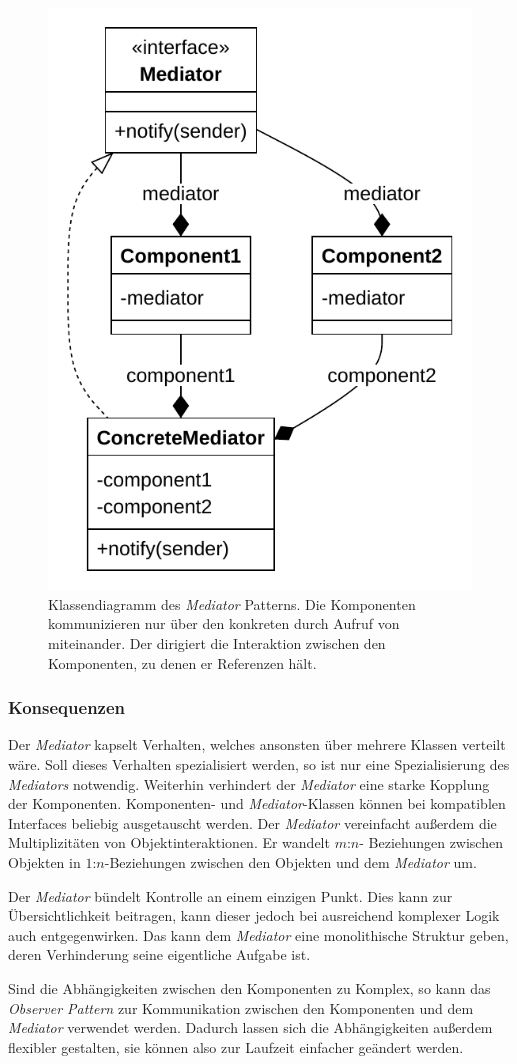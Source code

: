 \begin{figure}[!ht]
	\centering
	\includegraphics[width=0.75\linewidth]{images/patterns/mediator-class.pdf}
	\caption{Klassendiagramm des \emph{Mediator} Patterns. Die Komponenten kommunizieren nur über den konkreten  durch Aufruf von  miteinander. Der  dirigiert die Interaktion zwischen den Komponenten, zu denen er Referenzen hält. \cite{skobeleva_mediator_2023}}
	\label{fig:mediator-class}
\end{figure}

\subsubsection*{Konsequenzen}

Der \emph{Mediator} kapselt Verhalten, welches ansonsten über mehrere Klassen verteilt wäre. Soll dieses Verhalten spezialisiert werden, so ist nur eine Spezialisierung des \emph{Mediators} notwendig. Weiterhin verhindert der \emph{Mediator} eine starke Kopplung der Komponenten. Komponenten- und \emph{Mediator}-Klassen können bei kompatiblen Interfaces beliebig ausgetauscht werden. Der \emph{Mediator} vereinfacht außerdem die Multiplizitäten von Objektinteraktionen. Er wandelt $m$:$n$- Beziehungen zwischen Objekten in $1$:$n$-Beziehungen zwischen den Objekten und dem \emph{Mediator} um.

Der \emph{Mediator} bündelt Kontrolle an einem einzigen Punkt. Dies kann zur Übersichtlichkeit beitragen, kann dieser jedoch bei ausreichend komplexer Logik auch entgegenwirken. Das kann dem \emph{Mediator} eine monolithische Struktur geben, deren Verhinderung seine eigentliche Aufgabe ist.

Sind die Abhängigkeiten zwischen den Komponenten zu Komplex, so kann das \emph{Observer Pattern} zur Kommunikation zwischen den Komponenten und dem \emph{Mediator} verwendet werden. Dadurch lassen sich die Abhängigkeiten außerdem flexibler gestalten, sie können also zur Laufzeit einfacher geändert werden. \cite{gamma_design_1995}